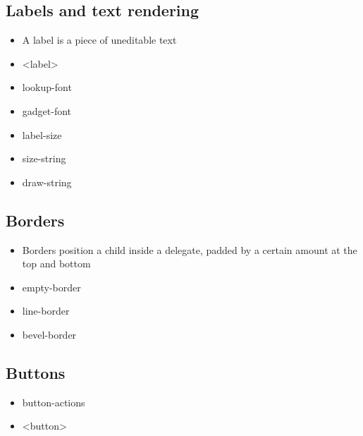 \documentclass{book}
\begin{document}
\subsection{Labels and text rendering}

\begin{itemize}

\item A label is a piece of uneditable text

\item <label>

\item lookup-font

\item gadget-font

\item label-size

\item size-string

\item draw-string

\end{itemize}

\subsection{Borders}

\begin{itemize}

\item Borders position a child inside a delegate, padded by a certain amount at the top and bottom

\item empty-border

\item line-border

\item bevel-border

\end{itemize}

\subsection{Buttons}

\begin{itemize}

\item button-actions

\item <button>

\end{itemize}
\end{document}
